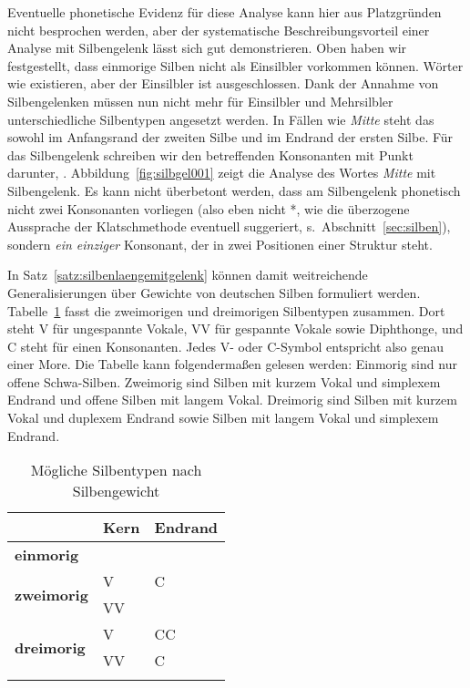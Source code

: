 Eventuelle phonetische Evidenz für diese Analyse kann hier aus Platzgründen nicht besprochen werden, aber der systematische Beschreibungsvorteil einer Analyse mit Silbengelenk lässt sich gut demonstrieren.
Oben haben wir festgestellt, dass einmorige Silben nicht als Einsilbler vorkommen können.
Wörter wie \textipa{[mI.t@]} existieren, aber der Einsilbler \textipa{[mI]} ist ausgeschlossen.
Dank der Annahme von Silbengelenken müssen nun nicht mehr für Einsilbler und Mehrsilbler unterschiedliche Silbentypen angesetzt werden.
In Fällen wie \textit{Mitte} steht das \textipa{[t]} sowohl im Anfangsrand der zweiten Silbe und im Endrand der ersten Silbe.
Für das Silbengelenk schreiben wir den betreffenden Konsonanten mit Punkt darunter, \zB \textipa{[mI\Sgel{t}@]}.
Abbildung~\ref{fig:silbgel001} zeigt die Analyse des Wortes \textit{Mitte} mit Silbengelenk.
Es kann nicht überbetont werden, dass am Silbengelenk phonetisch nicht zwei Konsonanten vorliegen (also eben nicht *\textipa{[mIt.t@]}, wie die überzogene Aussprache der Klatschmethode eventuell suggeriert, s.\ Abschnitt~\ref{sec:silben}), sondern \textit{ein einziger} Konsonant, der in zwei Positionen einer Struktur steht.

In Satz~\ref{satz:silbenlaengemitgelenk} können damit weitreichende Generalisierungen über Gewichte von deutschen Silben formuliert werden.
Tabelle~\ref{tab:morentypen} fasst die zweimorigen und dreimorigen Silbentypen zusammen.
Dort steht V für ungespannte Vokale, VV für gespannte Vokale sowie Diphthonge, und C steht für einen Konsonanten.
Jedes V- oder C-Symbol entspricht also genau einer More.
Die Tabelle kann folgendermaßen gelesen werden:
Einmorig sind nur offene Schwa-Silben.
Zweimorig sind Silben mit kurzem Vokal und simplexem Endrand und offene Silben mit langem Vokal.
Dreimorig sind Silben mit kurzem Vokal und duplexem Endrand sowie Silben mit langem Vokal und simplexem Endrand.


\begin{table}[!htbp]
	\centering
	\begin{tabular}{lll}
		\lsptoprule
		 & \textbf{Kern} & \textbf{Endrand} \\
		\midrule
		\textbf{einmorig} & \textipa{@} & \\
		\midrule
		\multirow{2}{*}{\textbf{zweimorig}} & V & C \\
		& VV & \\
		\midrule
		\multirow{2}{*}{\textbf{dreimorig}} & V & CC \\
		& VV & C \\
		\lspbottomrule
	\end{tabular}
	\caption{Mögliche Silbentypen nach Silbengewicht}	
	\label{tab:morentypen}
\end{table}

